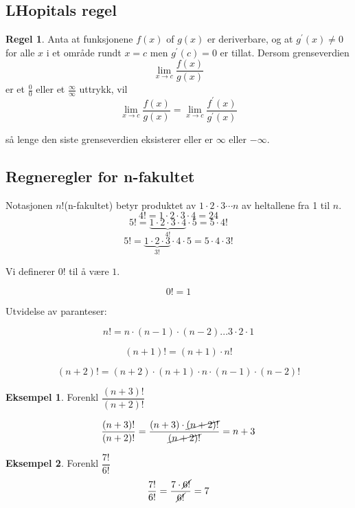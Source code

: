 \documentclass[11pt]{article}
\theoremstyle{definition}
\theoremstyle{definition}
\newtheorem{mitteks}{Eksempel}[section]
\theoremstyle{definition}
\theoremstyle{definition}
\theoremstyle{definition}
\newtheorem{regel}{Regel}
\newenvironment{fregel}
{\begin{mdframed}[style=minstil]\begin{regel}}
		{\end{regel}\end{mdframed}}
\theoremstyle{definition}
\begin{document}
	 \newpage
	 \subsection{LHopitals regel}
	 
	 \begin{fregel}
	 	Anta at funksjonene \(f(x)\) of \(g(x)\) er deriverbare, og at \(g^{\prime} (x)\neq 0 \) for alle \(x\) i et område rundt \(x=c\) men \(g^\prime (c)=0\) er tillat. Dersom grenseverdien
	 	\[\lim\limits_{x\rightarrow c}\frac{f(x)}{g(x)} \]
	 	er et \(\frac{0}{0}\) eller et \(\frac{\infty}{\infty}\) uttrykk, vil
	 	\[\lim\limits_{x\rightarrow c} \frac{f(x)}{g(x)}=\lim\limits_{x\rightarrow c} \frac{f^\prime (x)}{g^\prime (x)} \]
	 	
	 	så lenge den siste grenseverdien eksisterer eller er \(\infty \) eller \(-\infty \).
	 \end{fregel}
	 
	 \newpage
	 
	 \subsection{Regneregler for n-fakultet}
	 
	Notasjonen \(n!\)(n-fakultet) betyr produktet av \(1\cdot 2\cdot 3\cdots n \) av heltallene fra 1 til \(n\). 
	\[4!=1\cdot 2\cdot 3\cdot 4 = 24 \]
	\[5!=\underbrace{1\cdot 2\cdot 3\cdot 4}_{4!}\cdot5=5\cdot 4! \]
	\[5!=\underbrace{1\cdot 2\cdot 3}_{3!}\cdot 4 \cdot5=5\cdot 4 \cdot 3! \]
	
	Vi definerer \(0!\) til å være \(1\).
	
	\[0!=1 \]
	
	Utvidelse av paranteser:

	\[n!=n\cdot (n-1)\cdot (n-2)...3\cdot 2\cdot 1 \]
	
	\[(n+1)!=(n+1)\cdot n! \]
	
    \[(n+2)!=(n+2)\cdot (n+1) \cdot n\cdot (n-1)\cdot (n-2)! \]
	
	\begin{mitteks}
		Forenkl \(\dfrac{(n+3)!}{(n+2)!} \)
		
		\begin{align*}
		\dfrac{(n+3)!}{(n+2)!}=\dfrac{(n+3)\cdot \cancel{(n+2)!}}{\cancel{(n+2)!}}=n+3 
		\end{align*}
	\end{mitteks}
	
	\begin{mitteks}
		Forenkl \(\dfrac{7!}{6!}\) \[\dfrac{7!}{6!}=\dfrac{7\cdot \cancel{6!}}{\cancel{6!}}=7 \]
	\end{mitteks}
	
\end{document}
